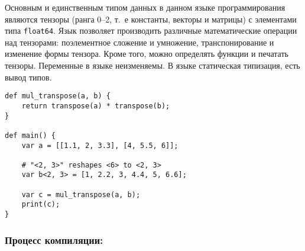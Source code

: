 Основным и единственным типом данных в данном языке программирования являются тензоры (ранга 0--2, т.~е константы, векторы и матрицы) с элементами типа \texttt{float64}. Язык позволяет производить различные математические операции над тензорами: поэлементное сложение и умножение, транспонирование и изменение формы тензора. Кроме того, можно определять функции и печатать тензоры. Переменные в языке неизменяемы. В языке статическая типизация, есть вывод типов.

\begin{lstlisting}[caption={Пример программы на мини языке программирования.}, frame=single]
def mul_transpose(a, b) {
    return transpose(a) * transpose(b);
}

def main() {
    var a = [[1.1, 2, 3.3], [4, 5.5, 6]];

    # "<2, 3>" reshapes <6> to <2, 3>
    var b<2, 3> = [1, 2.2, 3, 4.4, 5, 6.6];

    var c = mul_transpose(a, b);
    print(c);
}
\end{lstlisting}

\subsubsection*{Процесс компиляции:}


